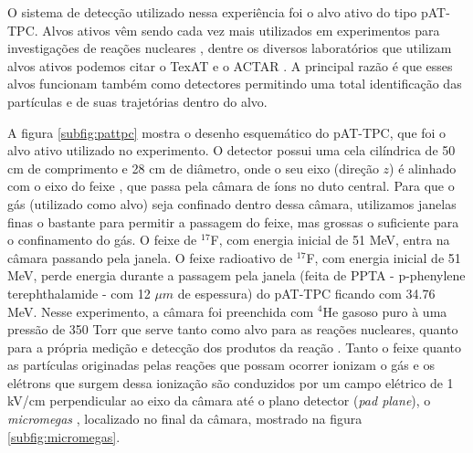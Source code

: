 \documentclass[a4paper,12pt,oneside]{book}
\begin{document}
\par O sistema de detecção utilizado nessa experiência foi o alvo ativo do tipo pAT-TPC. Alvos ativos vêm sendo cada vez mais utilizados em experimentos para investigações de reações nucleares \cite{FORTINO2022166497}, dentre os diversos laboratórios que utilizam alvos ativos podemos citar o TexAT \cite{KOSHCHIY2020163398} e o ACTAR \cite{MAUSS2019498}. A principal razão é que esses alvos funcionam também como detectores permitindo uma total identificação das partículas e de suas trajetórias dentro do alvo.

\par A figura \ref{subfig:pattpc} mostra o desenho esquemático do pAT-TPC, que foi o alvo ativo utilizado no experimento. O detector possui uma cela cilíndrica de 50 cm de comprimento e 28 cm de diâmetro, onde o seu eixo (direção $z$) é alinhado com o eixo do feixe \cite{pattpc}, que passa pela câmara de íons no duto central. Para que o gás (utilizado como alvo) seja confinado dentro dessa câmara, utilizamos janelas finas o bastante para permitir a passagem do feixe, mas grossas o suficiente para o confinamento do gás. O feixe de $^{17}$F, com energia inicial de 51 MeV, entra na câmara passando pela janela. O feixe radioativo de $^{17}$F, com energia inicial de 51 MeV, perde energia durante a passagem pela janela (feita de PPTA - p-phenylene terephthalamide - com 12 $\mu m$ de espessura) do pAT-TPC ficando com 34.76 MeV. Nesse experimento, a câmara foi preenchida com $^4$He gasoso puro à uma pressão de 350 Torr que serve tanto como alvo para as reações nucleares, quanto para a própria medição e detecção dos produtos da reação \cite{pattpc, pattpc2}. Tanto o feixe quanto as partículas originadas pelas reações que possam ocorrer ionizam o gás e os elétrons que surgem dessa ionização são conduzidos por um campo elétrico de 1 kV/cm perpendicular ao eixo da câmara até o plano detector (\textit{pad plane}), o \textit{micromegas} \cite{micromegas}, localizado no final da câmara, mostrado na figura \ref{subfig:micromegas}.


\end{document}
